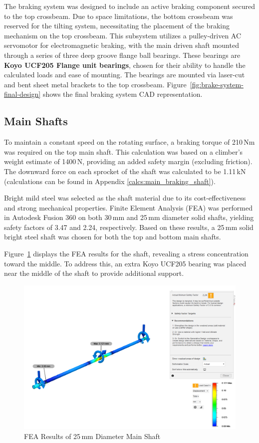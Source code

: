 The braking system was designed to include an active braking component secured to the top crossbeam. Due to space limitations, the bottom crossbeam was reserved for the tilting system, necessitating the placement of the braking mechanism on the top crossbeam. This subsystem utilizes a pulley-driven AC servomotor for electromagnetic braking, with the main driven shaft mounted through a series of three deep groove flange ball bearings. These bearings are \textbf{Koyo UCF205 Flange unit bearings}, chosen for their ability to handle the calculated loads and ease of mounting. The bearings are mounted via laser-cut and bent sheet metal brackets to the top crossbeam. Figure~\ref{fig:brake-system-final-design} shows the final braking system CAD representation.

\subsection{Main Shafts}

To maintain a constant speed on the rotating surface, a braking torque of 210\,Nm was required on the top main shaft. This calculation was based on a climber’s weight estimate of 1400\,N, providing an added safety margin (excluding friction). The downward force on each sprocket of the shaft was calculated to be 1.11\,kN (calculations can be found in Appendix \ref{calcs:main_braking_shaft}).

Bright mild steel was selected as the shaft material due to its cost-effectiveness and strong mechanical properties. Finite Element Analysis (FEA) was performed in Autodesk Fusion 360 on both 30\,mm and 25\,mm diameter solid shafts, yielding safety factors of 3.47 and 2.24, respectively. Based on these results, a 25\,mm solid bright steel shaft was chosen for both the top and bottom main shafts.

Figure~\ref{fig:FEM-mainshaft} displays the FEA results for the shaft, revealing a stress concentration toward the middle. To address this, an extra Koyo UCF205 bearing was placed near the middle of the shaft to provide additional support.

\begin{figure}[h]
    \centering
    \includegraphics[width=0.8\linewidth]{figs/final_design/FEMShaft.png}
    \caption{FEA Results of 25\,mm Diameter Main Shaft}
    \label{fig:FEM-mainshaft}
\end{figure}


